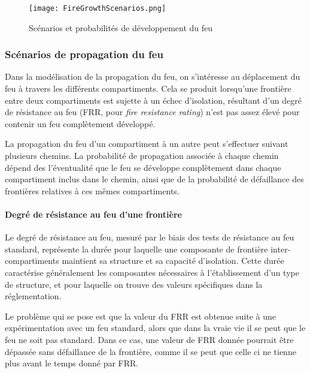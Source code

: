 \documentclass[11pt]{article}
\begin{document}
\begin{figure}
\begin{center}
\texttt{[image: FireGrowthScenarios.png]}
\end{center}
\caption{Scénarios et probabilités de développement du feu}
\label{FireGrowthScenarios}
\end{figure}

\subsubsection{Scénarios de propagation du feu}

Dans la modélisation de la propagation du feu, on s'intéresse au déplacement du feu à travers les différents compartiments. Cela se produit lorsqu'une frontière entre deux compartiments est sujette à un échec d'isolation, résultant d'un degré de résistance au feu (FRR, pour \textit{fire resistance rating}) n'est pas assez élevé pour contenir un feu complètement développé.

La propagation du feu d'un compartiment à un autre peut s'effectuer suivant plusieurs chemins. La probabilité de propagation associée à chaque chemin dépend des l'éventualité que le feu se développe complètement dans chaque compartiment inclus dans le chemin, ainsi que de la probabilité de défaillance des frontières relatives à ces mêmes compartiments.

\paragraph{Degré de résistance au feu d'une frontière}

Le degré de résistance au feu, mesuré par le biais des tests de résistance au feu standard, représente la durée pour laquelle une composante de frontière inter-compartiments maintient sa structure et sa capacité d'isolation. Cette durée caractérise généralement les composantes nécessaires à l'établissement d'un type de structure, et pour laquelle on trouve des valeurs spécifiques dans la réglementation.

Le problème qui se pose est que la valeur du FRR est obtenue suite à une expérimentation avec un feu standard, alors que dans la vraie vie il se peut que le feu ne soit pas standard. Dans ce cas, une valeur de FRR donnée pourrait être dépassée sans défaillance de la frontière, comme il se peut que celle ci ne tienne plus avant le temps donné par FRR.
\end{document}
